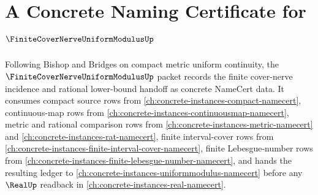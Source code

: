 \chapter{A Concrete Naming Certificate for $\FiniteCoverNerveUniformModulusUp$}
\label{ch:concrete-instances-finite-cover-nerve-uniform-modulus-namecert}

Following Bishop and Bridges on compact metric uniform continuity, the $\FiniteCoverNerveUniformModulusUp$ packet records the finite cover-nerve incidence and rational lower-bound handoff as concrete NameCert data. It consumes compact source rows from \autoref{ch:concrete-instances-compact-namecert}, continuous-map rows from \autoref{ch:concrete-instances-continuousmap-namecert}, metric and rational comparison rows from \autoref{ch:concrete-instances-metric-namecert} and \autoref{ch:concrete-instances-rat-namecert}, finite interval-cover rows from \autoref{ch:concrete-instances-finite-interval-cover-namecert}, finite Lebesgue-number rows from \autoref{ch:concrete-instances-finite-lebesgue-number-namecert}, and hands the resulting ledger to \autoref{ch:concrete-instances-uniformmodulus-namecert} before any $\RealUp$ readback in \autoref{ch:concrete-instances-real-namecert}.

